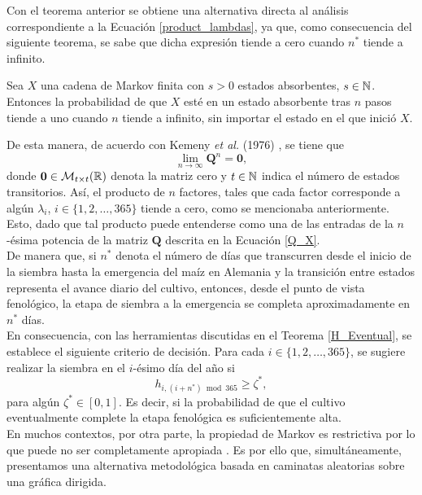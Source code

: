 Con el teorema anterior se obtiene una alternativa directa al análisis correspondiente a la Ecuación \eqref{product_lambdas}, ya que, como consecuencia del siguiente teorema, se sabe que dicha expresión tiende a cero cuando $n^*$ tiende a infinito.\\

\begin{theorem}
	Sea $X$ una cadena de Markov finita con $s>0$ estados absorbentes, $s\in \mathbb{N}$. Entonces la probabilidad de que $X$ esté en un estado absorbente tras $n$ pasos tiende a uno cuando $n$ tiende a infinito, sin importar el estado en el que inició $X$. 
\end{theorem}

De esta manera, de acuerdo con Kemeny \textit{et al.} (1976) \cite{Kemeny_1976}, se tiene que \begin{equation}
	\lim_{n\to \infty} \mathbf{Q}^n = \mathbf{0},
\end{equation}
donde $\mathbf{0}\in \mathcal{M}_{t\times t}(\mathbb{R})$ denota la matriz cero y $t\in \mathbb{N}$ indica el número de estados transitorios. Así, el producto de $n$ factores, tales que cada factor corresponde a algún $\lambda_i$, $i\in \{1,2,\ldots,365\}$ tiende a cero, como se mencionaba anteriormente. Esto, dado que tal producto puede entenderse como una de las entradas de la $n$-ésima potencia de la matriz $\mathbf{Q}$ descrita en la Ecuación \eqref{Q_X}.\\

De manera que, si $n^*$ denota el número de días que transcurren desde el inicio de la siembra hasta la emergencia del maíz en Alemania y la transición entre estados representa el avance diario del cultivo, entonces, desde el punto de vista fenológico, la etapa de siembra a la emergencia se completa aproximadamente en $n^*$ días.\\

En consecuencia, con las herramientas discutidas en el Teorema \ref{H_Eventual}, se establece el siguiente criterio de decisión. Para cada $i\in\{1,2,\ldots,365\}$, se sugiere realizar la siembra en el $i$-ésimo día del año si 
\begin{equation}
	h_{i,(i+n^*)\bmod 365} \geq \zeta^*,
\end{equation}
para algún $\zeta^*\in[0,1]$. Es decir, si la probabilidad de que el cultivo eventualmente complete la etapa fenológica es suficientemente alta.\\

En muchos contextos, por otra parte, la propiedad de Markov es restrictiva por lo que puede no ser completamente apropiada \cite{Boyd_1998}. Es por ello que, simultáneamente, presentamos una alternativa metodológica basada en caminatas aleatorias sobre una gráfica dirigida.\\


